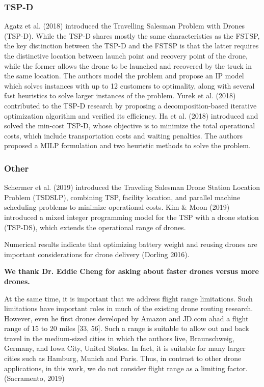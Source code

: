 \documentclass{article}
\begin{document}
	\subsubsection{TSP-D}
	Agatz et al. (2018) introduced the Travelling Salesman Problem with Drones (TSP-D). While the TSP-D shares mostly the same characteristics as the FSTSP, the key distinction between the TSP-D and the FSTSP is that the latter requires the distinctive location between launch point and recovery point of the drone, while the former allows the drone to be launched and recovered by the truck in the same location. The authors model the problem and propose an IP model which solves instances with up to 12 customers to optimality, along with several fast heuristics to solve larger instances of the problem. Yurek et al. (2018) contributed to the TSP-D research by proposing a decomposition-based iterative optimization algorithm and verified its efficiency. Ha et al. (2018) introduced and solved the min-cost TSP-D, whose objective is to minimize the total operational costs, which include  transportation costs and waiting penalties. The authors proposed a MILP formulation and two heuristic methods to solve the problem.
	\subsubsection{Other}
	Schermer et al. (2019) introduced the Traveling Salesman Drone Station Location Problem (TSDSLP), combining TSP, facility location, and parallel machine scheduling problems to minimize operational costs. 
	Kim \& Moon (2019) introduced a mixed integer programming model for the TSP with a drone station (TSP-DS), which extends the operational range of drones. 
	\par 
	\par 
	Numerical results indicate that optimizing battery weight and reusing drones are important considerations for drone delivery (Dorling 2016).
	\par 
	\textbf{We thank Dr. Eddie Cheng for asking about faster drones versus more drones.}
	\par
	At the same time, it is important that we address flight range limitations. Such limitations have important roles in much of the existing drone routing research. However, even he first drones developed by Amazon and JD.com ahad a flight range of 15 to 20 miles [33, 56]. Such a range is suitable to allow out and back travel in the medium-sized cities in which the authors live, Braunschweig, Germany, and Iowa City, United States. In fact, it is suitable for many larger cities such as Hamburg, Munich and Paris. Thus, in contrast to other drone applications, in this work, we do not consider flight range as a limiting factor. (Sacramento, 2019)
	
\end{document}
